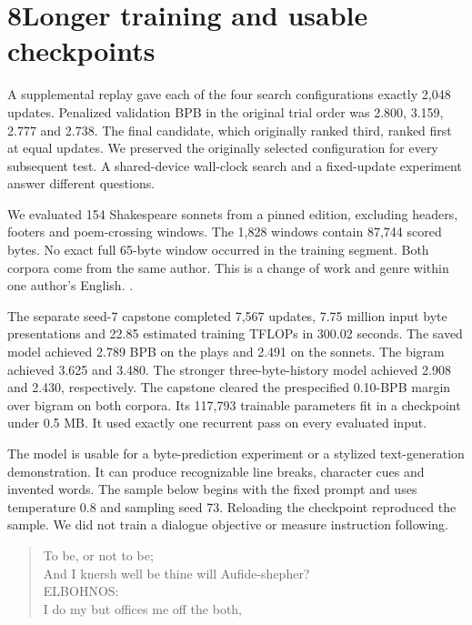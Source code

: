 \section*{8\quad Longer training and usable checkpoints}
 A supplemental replay gave each of the four search configurations exactly 2,048 updates. Penalized validation BPB in the original trial order was 2.800, 3.159, 2.777 and 2.738. The final candidate, which originally ranked third, ranked first at equal updates. We preserved the originally selected configuration for every subsequent test. A shared-device wall-clock search and a fixed-update experiment answer different questions.

 We evaluated 154 Shakespeare sonnets from a pinned edition, excluding headers, footers and poem-crossing windows. The 1,828 windows contain 87,744 scored bytes. No exact full 65-byte window occurred in the training segment. Both corpora come from the same author. This is a change of work and genre within one author's English. .


 The separate seed-7 capstone completed 7,567 updates, 7.75 million input byte presentations and 22.85 estimated training TFLOPs in 300.02 seconds. The saved model achieved 2.789 BPB on the plays and 2.491 on the sonnets. The bigram achieved 3.625 and 3.480. The stronger three-byte-history model achieved 2.908 and 2.430, respectively. The capstone cleared the prespecified 0.10-BPB margin over bigram on both corpora. Its 117,793 trainable parameters fit in a checkpoint under 0.5 MB. It used exactly one recurrent pass on every evaluated input.

The model is usable for a byte-prediction experiment or a stylized text-generation demonstration. It can produce recognizable line breaks, character cues and invented words. The sample below begins with the fixed prompt and uses temperature 0.8 and sampling seed 73. Reloading the checkpoint reproduced the sample. We did not train a dialogue objective or measure instruction following.
\begin{quote}\small\ttfamily
To be, or not to be;\\
And I knersh well be thine will Aufide-shepher?\\[3pt]
ELBOHNOS:\\
I do my but offices me off the both,
\end{quote}
